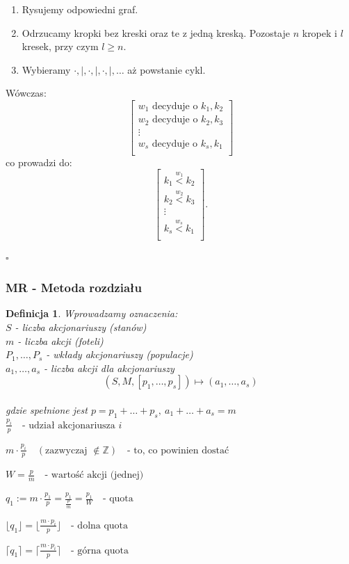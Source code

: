 \documentclass[12pt,a4paper]{article}
\theoremstyle{break}
\newtheorem{definition}{Definicja}[section]
\begin{document}
		\begin{enumerate}[1.]
			\item Rysujemy odpowiedni graf.
			\item Odrzucamy kropki bez kreski oraz te z jedną kreską. Pozostaje $n$ kropek i $l$ kresek, przy czym $l \geq n$.
			\item Wybieramy $\cdot, |, \cdot, |, \cdot, |, \dots$ aż powstanie cykl.
		\end{enumerate}
		
		Wówczas:
		\[
		\begin{bmatrix}
			w_1 \text{ decyduje o } k_1, k_2 \\
			w_2 \text{ decyduje o } k_2, k_3 \\
			\vdots \\
			w_s \text{ decyduje o } k_s, k_1 \\
		\end{bmatrix}
		\]
		co prowadzi do:
		\[
		\begin{bmatrix}
			k_1 \overset{w_1}{<} k_2 \\
			k_2 \overset{w_2}{<} k_3 \\
			\vdots \\
			k_s \overset{w_s}{<} k_1 \\
		\end{bmatrix}.
		\]
	
	\begin{flushright}
		$\square$
	\end{flushright}
	
	\subsubsection{MR - Metoda rozdziału}
	\begin{definition}
		Wprowadzamy oznaczenia:\\
		$S$ - liczba akcjonariuszy (stanów)\\
		$m$ - liczba akcji (foteli)\\
		$P_1,\dots,P_s$ - wkłady akcjonariuszy (populacje)\\
		$a_1,\dots,a_s$ - liczba akcji dla akcjonariuszy\\
		
		$$(S,M,[p_1,\dots,p_s]) \longmapsto (a_1,\dots,a_s)$$\\
		gdzie spełnione jest $p=p_1+\dots+p_s,\: a_1+\dots+a_s=m$\\
		
		
		$\frac{p_i}{p} \quad \text{- udział akcjonariusza } i$
		
		
		$m\cdot\frac{p_i}{p} \quad (\text{zazwyczaj } \notin \mathbb{Z}) \quad \text{- to, co powinien dostać}$
		
		
		$W=\frac{p}{m} \quad \text{- wartość akcji (jednej)}$
		
		
		$q_1:= m\cdot \frac{p_1}{p} = \frac{p_1}{\frac{p}{m}} = \frac{p_1}{W} \quad \text{- quota}$
		
		
		$\lfloor q_1 \rfloor=\lfloor \frac{m\cdot p_i}{p} \rfloor \quad \text{- dolna quota}$
		
		
		$\lceil q_1 \rceil=\lceil \frac{m\cdot p_i}{p} \rceil \quad \text{- górna quota}$
		
	\end{definition}
	
\end{document}
